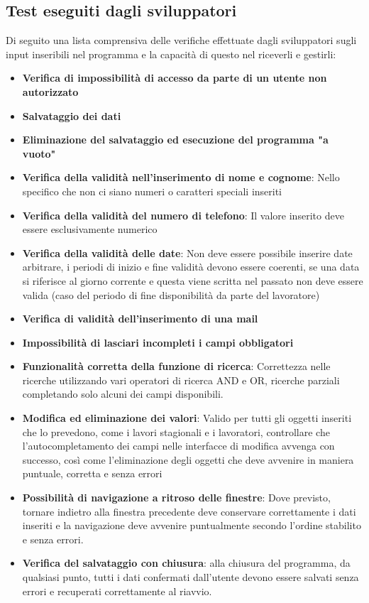 \documentclass[a4paper,11pt]{article}
\begin{document}
\newpage

\subsection{Test eseguiti dagli sviluppatori}
Di seguito una lista comprensiva delle verifiche effettuate dagli sviluppatori sugli input inseribili nel programma e la capacità di questo nel riceverli e gestirli:
\begin{itemize}
	\item \textbf{Verifica di impossibilità di accesso da parte di un utente non autorizzato}
	\item \textbf{Salvataggio dei dati}
	\item \textbf{Eliminazione del salvataggio ed esecuzione del programma "a vuoto"}
	\item \textbf{Verifica della validità nell'inserimento di nome e cognome}: Nello specifico che non ci siano numeri o caratteri speciali inseriti
	\item \textbf{Verifica della validità del numero di telefono}: Il valore inserito deve essere esclusivamente numerico
	\item \textbf{Verifica della validità delle date}: Non deve essere possibile inserire date arbitrare, i periodi di inizio e fine validità devono essere coerenti, se una data si riferisce al giorno corrente e questa viene scritta nel passato non deve essere valida (caso del periodo di fine disponibilità da parte del lavoratore)
	\item \textbf{Verifica di validità dell'inserimento di una mail}
	\item \textbf{Impossibilità di lasciari incompleti i campi obbligatori}
	\item \textbf{Funzionalità corretta della funzione di ricerca}: Correttezza nelle ricerche utilizzando vari operatori di ricerca AND e OR, ricerche parziali completando solo alcuni dei campi disponibili.
	\item \textbf{Modifica ed eliminazione dei valori}: Valido per tutti gli oggetti inseriti che lo prevedono, come i lavori stagionali e i lavoratori, controllare che l'autocompletamento dei campi nelle interfacce di modifica avvenga con successo, così come l'eliminazione degli oggetti che deve avvenire in maniera puntuale, corretta e senza errori
	\item \textbf{Possibilità di navigazione a ritroso delle finestre}: Dove previsto, tornare indietro alla finestra precedente deve conservare correttamente i dati inseriti e la navigazione deve avvenire puntualmente secondo l'ordine stabilito e senza errori.
	\item \textbf{Verifica del salvataggio con chiusura}: alla chiusura del programma, da qualsiasi punto, tutti i dati confermati dall'utente devono essere salvati senza errori e recuperati correttamente al riavvio. 
\end{itemize}
\end{document}
